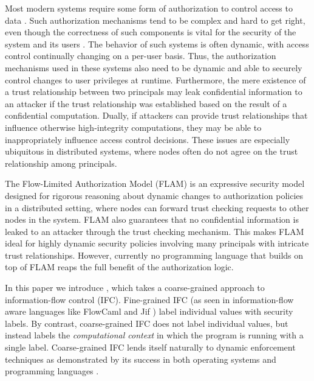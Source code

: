Most modern systems require some form of authorization to control access to data \cite{Menezes:1996:HAC:548089}. Such authorization mechanisms tend to be complex and hard to get right, even though the correctness of such components is vital for the security of the system and its users \cite{Ferraiolo:1999:RAC:300830.300834}. 
The behavior of such systems is often dynamic, with access control continually changing on a per-user basis. Thus, the authorization mechanisms used in these systems also need to be dynamic and able to securely control changes to user privileges \cite{Ferraiolo:1999:RAC:300830.300834} at runtime. Furthermore, the mere existence of a trust relationship between two principals may leak confidential information to an attacker if the trust relationship was established based on the result of a confidential computation. Dually, if attackers can provide trust relationships that influence otherwise high-integrity computations, they may be able to inappropriately influence access control decisions. These issues are especially ubiquitous in distributed systems, where nodes often do not agree on the trust relationship among principals.

The Flow-Limited Authorization Model (FLAM) \cite{Arden:2015:FA:2859845.2859998} is an expressive security model designed for rigorous reasoning about dynamic changes to authorization policies in a distributed setting, where nodes can forward trust checking requests to other nodes in the system. FLAM also guarantees that no confidential information is leaked to an attacker through the trust checking mechanism. This makes FLAM ideal for highly dynamic security policies involving many principals with intricate trust relationships. However, currently no programming language that builds on top of FLAM reaps the full benefit of the authorization logic.

In this paper we introduce \lang{}, which takes a coarse-grained approach to information-flow control (IFC). Fine-grained IFC (as seen in information-flow aware languages like FlowCaml \cite{Pottier:2003:IFI:596980.596983} and Jif \cite{Myers:1999:JPM:292540.292561}) label individual values with security labels. By contrast, coarse-grained IFC does not label individual values, but instead labels the \emph{computational context} in which the program is running with a single label. Coarse-grained IFC lends itself naturally to dynamic enforcement techniques as demonstrated by its success in both operating systems \cite{Zeldovich:2006:MIF:1267308.1267327, Zeldovich:2008:SDS:1387589.1387610, Efstathopoulos:2005:LEP:1095810.1095813, Krohn:2007:IFC:1294261.1294293} and programming languages \cite{SRMMlio, Buiras:2015:HMS:2784731.2784758, Stefan:2012:ACT:2364527.2364557, Buiras:2015:DED:2786558.2786563}.

